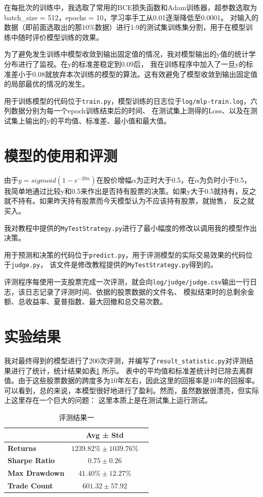 \documentclass[final,5p,times,twocolumn,authoryear]{elsarticle}
\begin{document}
在每批次的训练中，我选取了常用的BCE损失函数和Adam训练器，超参数选取为batch\_size = 512，epochs = 10，学习率手工从0.01逐渐降低至0.0001。
对输入的数据（即前面选取出的那10\%数据）进行1:9的测试集训练集分割，用于在模型训练中随时评价模型训练的效果。

为了避免发生训练中模型收敛到输出固定值的情况，我对模型输出的y值的统计学分布进行了监视。在y的标准差稳定到0.09后，
我在训练程序中加入了一旦y的标准差小于0.08就放弃本次训练的模型的算法。这有效避免了模型收敛到输出固定值的局部最优的情况的发生。

用于训练模型的代码位于\texttt{train.py}，模型训练的日志位于\texttt{log/mlp-train.log}，六列数据分别为每一个epoch训练结束后的时间、
在测试集上测得的Loss、以及在测试集上输出的y的平均值、标准差、最小值和最大值。

\section{模型的使用和评测}
由于\(y = sigmoid(1 - e^{-20\alpha})\)在股价增幅\(\alpha\)为正时大于0.5，在\(\alpha\)为负时小于0.5，
我简单地通过比较y和0.5来作出是否持有股票的决策。如果y大于0.5就持有，反之就不持有。如果昨天持有股票而今天模型认为不应该持有股票，就抛售，
反之就买入。

我对教程中提供的\texttt{MyTestStrategy.py}进行了最小幅度的修改以调用我的模型作出决策。

用于预测和决策的代码位于\texttt{predict.py}，用于评测模型的实际交易效果的代码位于\texttt{judge.py}，
该文件是修改教程提供的\texttt{MyTestStrategy.py}得到的。

评测程序每使用一支股票完成一次评测，就会向\texttt{log/judge/judge.csv}输出一行日志，该日志记录了评测时间、依据的股票数据的文件名、
模拟结束时的总剩余金额、总收益率、夏普指数、最大回撤和总交易次数。

\section{实验结果}
我对最终得到的模型进行了200次评测，并编写了\texttt{result\_statistic.py}对评测结果进行了统计，统计结果如表\ref*{tab:performance1} 所示。
表中的平均值和标准差统计时已除去离群值。由于这些股票数据的跨度多为10年左右，因此这里的回报率是10年的回报率。
可以看到，总的来说，本模型很好地进行了盈利。然而，虽然数据很漂亮，但实际上这里存在一个巨大的问题：
这里本质上是在测试集上运行测试。
\begin{table}[h!]
       \centering
       \begin{tabular}{@{}lcc@{}}
              \toprule
              \textbf{}             & \textbf{Avg ± Std}        \\ \midrule
              \textbf{Returns}      & $1239.82\% \pm 1039.76\%$ \\
              \textbf{Sharpe Ratio} & $0.75 \pm 0.26$           \\
              \textbf{Max Drawdown} & $41.40\%\pm 12.27\%$      \\
              \textbf{Trade Count}  & $601.32 \pm 57.92$        \\ \midrule
       \end{tabular}
       \caption{评测结果一}
       \label{tab:performance1}
\end{table}
\end{document}
